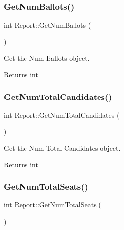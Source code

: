 \subsubsection{\texorpdfstring{Get\+Num\+Ballots()}{GetNumBallots()}}
{\footnotesize\ttfamily int Report\+::\+Get\+Num\+Ballots (\begin{DoxyParamCaption}{ }\end{DoxyParamCaption})\hspace{0.3cm}{\ttfamily [inline]}}



Get the Num Ballots object. 

\begin{DoxyReturn}{Returns}
int 
\end{DoxyReturn}
\mbox{\label{classReport_a67565c88d75816e4c427f0a45a8ba288}} 
\subsubsection{\texorpdfstring{Get\+Num\+Total\+Candidates()}{GetNumTotalCandidates()}}
{\footnotesize\ttfamily int Report\+::\+Get\+Num\+Total\+Candidates (\begin{DoxyParamCaption}{ }\end{DoxyParamCaption})\hspace{0.3cm}{\ttfamily [inline]}}



Get the Num Total Candidates object. 

\begin{DoxyReturn}{Returns}
int 
\end{DoxyReturn}
\mbox{\label{classReport_a6a368d1b0ab54c2f50e76d56f9837f18}} 
\subsubsection{\texorpdfstring{Get\+Num\+Total\+Seats()}{GetNumTotalSeats()}}
{\footnotesize\ttfamily int Report\+::\+Get\+Num\+Total\+Seats (\begin{DoxyParamCaption}{ }\end{DoxyParamCaption})\hspace{0.3cm}{\ttfamily [inline]}}



